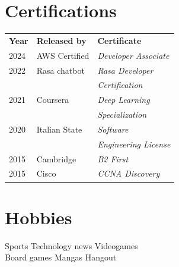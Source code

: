 \documentclass[]{deedy-resume-openfont}
\begin{document}
\begin{minipage}[t]{0.33\textwidth}
\section{Certifications}
\begin{tabular}{@{}lll@{}}
\textbf{Year} & \textbf{Released by} & \textbf{Certificate} \\
2024          & AWS Certified & \textit{Developer Associate} \\
2022          & Rasa chatbot  & \textit{Rasa Developer} \\
              &               & \textit{Certification} \\
2021          & Coursera      & \textit{Deep Learning} \\
              &               & \textit{Specialization} \\
2020          & Italian State & \textit{Software}\\
              &               & \textit{Engineering License} \\
2015	      & Cambridge     & \textit{B2 First} \\
2015	      & Cisco         & \textit{CCNA Discovery} \\
\end{tabular}
\sectionsep


\section{Hobbies}
Sports \textbullet{} Technology news \textbullet{} Videogames \\
Board games \textbullet{} Mangas \textbullet{} Hangout

%
%

\end{minipage}
\hfill
\end{document}

